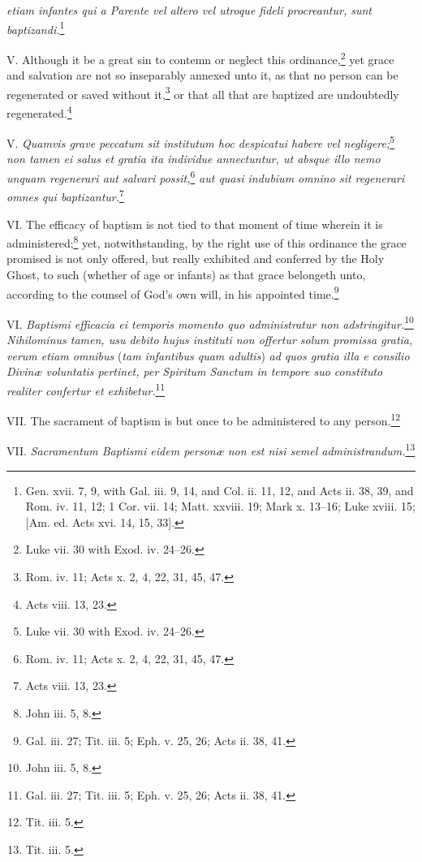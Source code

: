 \emph{etiam infantes qui a Parente vel altero vel utroque fideli procreantur, sunt baptizandi.}\footnote{Gen. xvii. 7, 9, with Gal. iii. 9, 14, and Col. ii. 11, 12, and Acts ii. 38, 39, and Rom. iv. 11, 12; 1 Cor. vii. 14; Matt. xxviii. 19; Mark x. 13–16; Luke xviii. 15; [Am. ed. Acts xvi. 14, 15, 33].}

V. Although it be a great sin to contemn or neglect this ordinance,\footnote{Luke vii. 30 with Exod. iv. 24–26.} yet grace and salvation are not so inseparably annexed unto it, as that no person can be regenerated or saved without it,\footnote{Rom. iv. 11; Acts x. 2, 4, 22, 31, 45, 47.} or that all that are baptized are undoubtedly regenerated.\footnote{Acts viii. 13, 23.}

V. \emph{Quamvis grave peccatum sit institutum hoc despicatui habere vel negligere;}\footnote{Luke vii. 30 with Exod. iv. 24–26.}\emph{ non tamen ei salus et gratia ita individue annectuntur, ut absque illo nemo unquam regenerari aut salvari possit,}\footnote{Rom. iv. 11; Acts x. 2, 4, 22, 31, 45, 47.}\emph{ aut quasi indubium omnino sit regenerari omnes qui baptizantur.}\footnote{Acts viii. 13, 23.}

VI. The efficacy of baptism is not tied to that moment of time wherein it is administered;\footnote{John iii. 5, 8.} yet, notwithstanding, by the right use of this ordinance the grace promised is not only offered, but really exhibited and conferred by the Holy Ghost, to such (whether of age or infants) as that grace belongeth unto, according to the counsel of God's own will, in his appointed time.\footnote{Gal. iii. 27; Tit. iii. 5; Eph. v. 25, 26; Acts ii. 38, 41.}

VI. \emph{Baptismi efficacia ei temporis momento quo administratur non adstringitur.}\footnote{John iii. 5, 8.}\emph{ Nihilominus tamen, usu debito hujus instituti non offertur solum promissa gratia, verum etiam omnibus }(\emph{tam infantibus quam adultis})\emph{ ad quos gratia illa e consilio Divinæ voluntatis pertinet, per Spiritum Sanctum in tempore suo constituto realiter confertur et exhibetur.}\footnote{Gal. iii. 27; Tit. iii. 5; Eph. v. 25, 26; Acts ii. 38, 41.}

VII. The sacrament of baptism is but once to be administered to any person.\footnote{Tit. iii. 5.}

VII. \emph{Sacramentum Baptismi eidem personæ non est nisi semel administrandum.}\footnote{Tit. iii. 5.}


